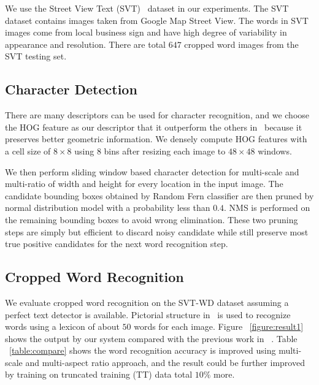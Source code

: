 \documentclass[10pt,twocolumn,letterpaper]{article}
\begin{document}
We use the Street View Text (SVT)~\cite{417} dataset in our experiments. The SVT dataset contains images taken from Google Map Street View. The words in SVT images come from local business sign and have high degree of variability in appearance and resolution. There are total $647$ cropped word images from the SVT testing set.

\subsection{Character Detection}

There are many descriptors can be used for character recognition, and we choose the HOG feature as our descriptor that it outperform the others in~\cite{117} because it preserves better geometric information. We densely compute HOG features with a cell size of $8 \times 8$ using $8$ bins after resizing each image to $48 \times 48$ windows.

We then perform sliding window based character detection for multi-scale and multi-ratio of width and height for every location in the input image. The candidate bounding boxes obtained by Random Fern classifier are then pruned by normal distribution model with a probability less than $0.4$. NMS is performed on the remaining bounding boxes to avoid wrong elimination. These two pruning steps are simply but efficient to discard noisy candidate while still preserve most true positive candidates for the next word recognition step.

\subsection{Cropped Word Recognition}

We evaluate cropped word recognition on the SVT-WD dataset assuming a perfect text detector is available. Pictorial structure in~\cite{417} is used to recognize words using a lexicon of about $50$ words for each image. Figure ~\ref{figure:result1} shows the output by our system compared with the previous work in ~\cite{417}. Table ~\ref{table:compare} shows the word recognition accuracy is improved using multi-scale and multi-aspect ratio approach, and the result could be further improved by training on truncated training (TT) data total $10\%$ more.
\end{document}
